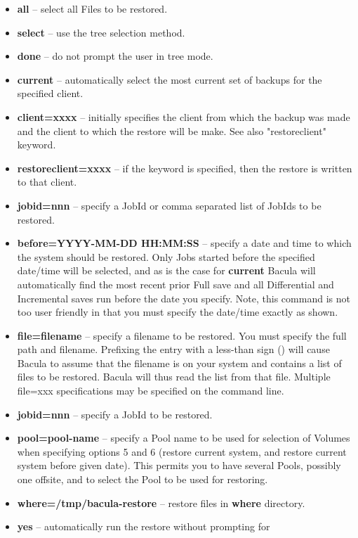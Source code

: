 \begin{itemize}
\item {\bf all} -- select all Files to be restored.  
\item {\bf select} -- use the tree selection method.  
\item {\bf done} -- do not prompt the user in tree mode.  
\item {\bf current} -- automatically select the most current set of  backups
   for the specified client.  
\item {\bf client=xxxx} -- initially specifies the client from which the
   backup was made and the client to which the restore will be make.  See also
   "restoreclient" keyword.
\item {\bf restoreclient=xxxx} -- if the keyword is specified, then the
   restore is written to that client.
\item {\bf jobid=nnn} -- specify a JobId or comma separated list of  JobIds to
   be restored.  
\item {\bf before=YYYY-MM-DD HH:MM:SS} -- specify a date and time to  which
   the system should be restored. Only Jobs started before  the specified
   date/time will be selected, and as is the case  for {\bf current} Bacula will
   automatically find the most  recent prior Full save and all Differential and
   Incremental  saves run before the date you specify. Note, this command is  not
   too user friendly in that you must specify the date/time  exactly as shown. 
\item {\bf file=filename} -- specify a filename to be restored. You  must
   specify the full path and filename. Prefixing the entry  with a less-than
   sign
   (\lt{}) will cause Bacula to assume that the  filename is on your system and
   contains a list of files to be  restored. Bacula will thus read the list from
   that file. Multiple  file=xxx specifications may be specified on the command
   line. 
\item {\bf jobid=nnn} -- specify a JobId to be restored. 
\item {\bf pool=pool-name} -- specify a Pool name to be used for selection  of
   Volumes when specifying options 5 and 6 (restore current system,  and restore
   current system before given date). This permits you to  have several Pools,
   possibly one offsite, and to select the Pool to  be used for restoring.  
\item {\bf where=/tmp/bacula-restore} -- restore files in {\bf where} directory.
\item {\bf yes} -- automatically run the restore without prompting  for

\end{itemize}
